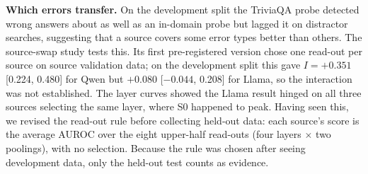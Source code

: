 \documentclass[11pt]{article}
\newcommand{\finish}{\texttt{Finish}}
\begin{document}
\textbf{Which errors transfer.} On the development split the TriviaQA probe detected wrong answers about as well as
an in-domain probe but lagged it on distractor searches, suggesting that a source covers some error types better
than others. The source-swap study tests this. Its first pre-registered version chose one read-out per source on
source validation data; on the development split this gave $I=+0.351$ [0.224, 0.480] for Qwen but $+0.080$
[$-0.044$, 0.208] for Llama, so the interaction was not established. The layer curves showed the Llama result
hinged on all three sources selecting the same layer, where S0 happened to peak. Having seen this, we revised the
read-out rule before collecting held-out data: each source's score is the average AUROC over the eight upper-half
read-outs (four layers $\times$ two poolings), with no selection. Because the rule was chosen after seeing
development data, only the held-out test counts as evidence.

\begin{table}[t]
\centering\small
\caption{Source swap on the 600 held-out questions per model: same-step AUROC averaged over eight upper-layer
read-outs, and the pre-registered gaps with 95\% question-bootstrap CIs. \finish: 570 / 536 steps (195 / 134
wrong); distractor: 1058 / 1235 steps (209 / 268 wrong). Last column: point estimates of $I$ / $G$ / $C$ under the
first protocol's single source-selected read-out, scored on the same data.}
\label{tab:swap}
\setlength{\tabcolsep}{4pt}
\end{table}
\end{document}
